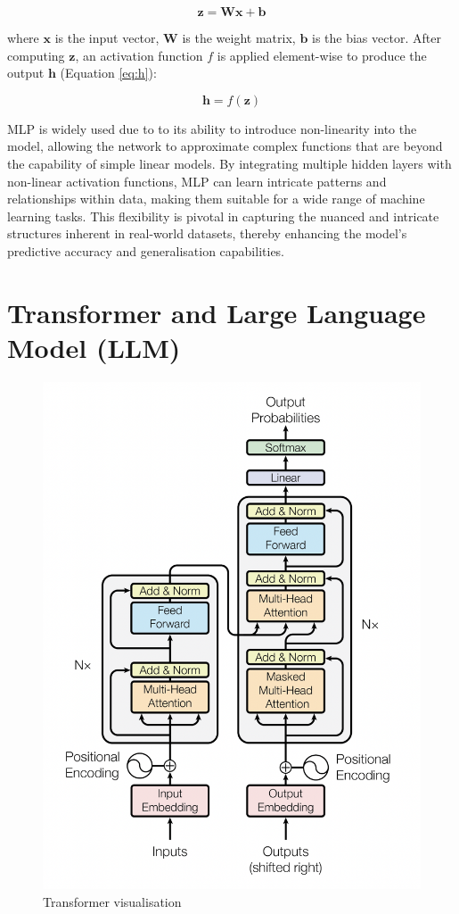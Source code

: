 \begin{equation}
    \label{eq:z}
    \mathbf{z} = \mathbf{W}\mathbf{x} + \mathbf{b}
\end{equation}

where \( \mathbf{x} \) is the input vector, \( \mathbf{W} \) is the weight matrix, \( \mathbf{b} \) is the bias vector. After computing \( \mathbf{z} \), an activation function \( f \) is applied element-wise to produce the output \( \mathbf{h} \) (Equation \eqref{eq:h}):

\begin{equation}
    \label{eq:h}
    \mathbf{h} = f(\mathbf{z})
\end{equation}

MLP is widely used due to to its ability to introduce non-linearity into the model, allowing the network to approximate complex functions that are beyond the capability of simple linear models. By integrating multiple hidden layers with non-linear activation functions, MLP can learn intricate patterns and relationships within data, making them suitable for a wide range of machine learning tasks. This flexibility is pivotal in capturing the nuanced and intricate structures inherent in real-world datasets, thereby enhancing the model's predictive accuracy and generalisation capabilities.


\section{Transformer and Large Language Model (LLM)}

\begin{figure}[htbp]
    \centering
    \includegraphics[width=0.7\linewidth]{images/transformer.png}
    \caption{Transformer visualisation \cite{vaswani-2023-attention}}
    \label{fig:transformer}
\end{figure}

